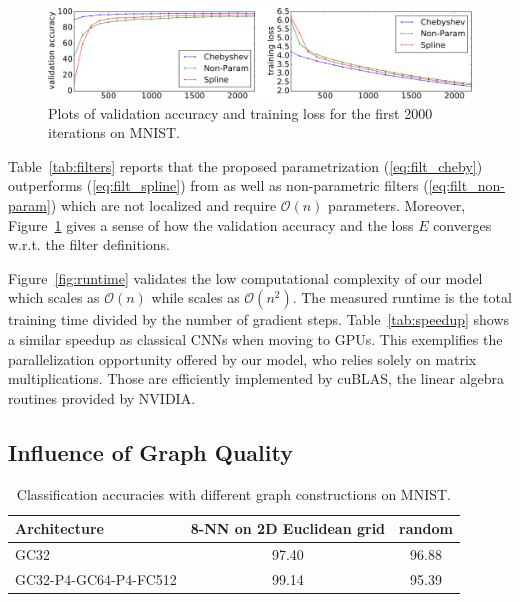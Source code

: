 \documentclass{article}
\newcommand{\bO}{\mathcal{O}}
\newcommand{\figref}[1]{Figure~\ref{fig:#1}}
\newcommand{\tabref}[1]{Table~\ref{tab:#1}}
\newcommand{\eqnref}[1]{(\ref{eq:#1})}
\begin{document}
\begin{figure}[t]
\centering
\includegraphics[width=\textwidth]{training}
\caption{Plots of validation accuracy and training loss for the first 2000
iterations on MNIST.}
\label{fig:convergence}
\end{figure}

\tabref{filters} reports that the proposed parametrization \eqnref{filt_cheby}
outperforms \eqnref{filt_spline} from \cite{art:BrunaZarembaSzlamLeCun13DLgraphs} as well as non-parametric
filters \eqnref{filt_non-param} which are not localized and require $\bO(n)$
parameters. Moreover, \figref{convergence} gives a sense of how the validation
accuracy and the loss $E$ converges w.r.t. the filter definitions.

\figref{runtime} validates the low computational complexity of our model which
scales as $\bO(n)$ while \cite{art:BrunaZarembaSzlamLeCun13DLgraphs} scales as $\bO(n^2)$. The measured
runtime is the total training time divided by the number of gradient steps.
\tabref{speedup} shows a similar speedup as classical CNNs when moving to GPUs.
This exemplifies the parallelization opportunity offered by our model, who
relies solely on matrix multiplications. Those are efficiently implemented by
cuBLAS, the linear algebra routines provided by NVIDIA.

\subsection{Influence of Graph Quality} \label{sec:graph_quality}

\begin{table}[t]
\centering
\begin{tabular}{lcc} \toprule
Architecture & 8-NN on 2D Euclidean grid & random \\
\midrule
GC32 & 97.40 & 96.88 \\
GC32-P4-GC64-P4-FC512 & 99.14 & 95.39 \\
\bottomrule \end{tabular}
\caption{Classification accuracies with different graph constructions on MNIST.} 
\label{tab:mnist_quality}
\end{table}
\end{document}
